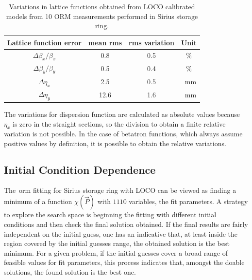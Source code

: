 \begin{table}
    \centering
    \caption{Variations in lattice functions obtained from LOCO calibrated models from 10 ORM measurements performed in Sirius storage ring.}
    \label{tab:twiss_var}
    \begin{tabular}{cccc}
        \toprule\toprule
        Lattice function error & mean rms & rms variation & Unit \\
        \hline
        $\Delta\beta_x/\beta_x$ & \num{0.8}& \num{0.5} & \%\\
        $\Delta\beta_y/\beta_y$ & \num{0.5} & \num{0.4}& \% \\
        $\Delta\eta_x$ & \num{2.5} & \num{0.5} & \SI{}{\milli\meter}\\
        $\Delta\eta_y$ & \num{12.6} & \num{1.6} & \SI{}{\milli\meter} \\
        \bottomrule\bottomrule
    \end{tabular}
\end{table}

The variations for dispersion function are calculated as absolute values because $\eta_x$ is zero in the straight sections, so the division to obtain a finite relative variation is not possible. In the case of betatron functions, which always assume positive values by definition, it is possible to obtain the relative variations.


\subsection{Initial Condition Dependence}
The~\gls{orm} fitting for Sirius storage ring with LOCO can be viewed as finding a minimum of a function $\chi\left(\Vec{P}\right)$ with $1110$ variables, the fit parameters. A strategy to explore the search space is beginning the fitting with different initial conditions and then check the final solution obtained. If the final results are fairly independent on the initial guess, one has an indicative that, at least inside the region covered by the initial guesses range, the obtained solution is the best minimum. For a given problem, if the initial guesses cover a broad range of feasible values for fit parameters, this process indicates that, amongst the doable solutions, the found solution is the best one.

